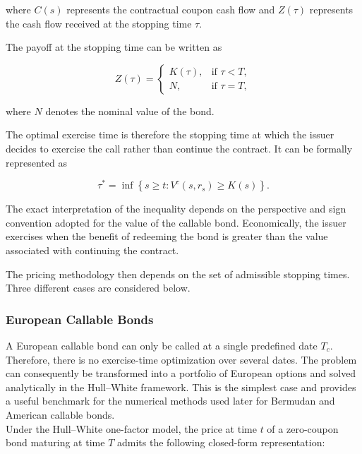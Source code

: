 \documentclass{article}
\begin{document}
where $C(s)$ represents the contractual coupon cash flow and $Z(\tau)$ represents the cash flow received at the stopping time $\tau$.

The payoff at the stopping time can be written as

\begin{equation}
Z(\tau)
=
\begin{cases}
K(\tau), & \text{if } \tau<T,\\
N, & \text{if } \tau=T,
\end{cases}
\end{equation}

where $N$ denotes the nominal value of the bond.

The optimal exercise time is therefore the stopping time at which
the issuer decides to exercise the call rather than continue the
contract. It can be formally represented as

\begin{equation}
\tau^*
=
\inf
\left\{
s\geq t:
V^c(s,r_s)\geq K(s)
\right\}.
\end{equation}

The exact interpretation of the inequality depends on the
perspective and sign convention adopted for the value of the
callable bond. Economically, the issuer exercises when the benefit
of redeeming the bond is greater than the value associated with
continuing the contract.

The pricing methodology then depends on the set of admissible
stopping times. Three different cases are considered below.



\subsubsection{European Callable Bonds}

A European callable bond can only be called at a single predefined
date $T_c$. Therefore, there is no exercise-time optimization over
several dates. The problem can consequently be transformed into a
portfolio of European options and solved analytically in the
Hull--White framework. This is the simplest case and provides a useful benchmark for the numerical methods used later for Bermudan and American callable bonds.
\\

Under the Hull--White one-factor model, the price at time $t$ of a
zero-coupon bond maturing at time $T$ admits the following
closed-form representation:
\end{document}
